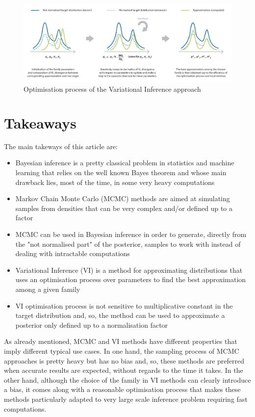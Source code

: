 \begin{figure}[h]
    \centering
\includegraphics[width=\textwidth]{pic/p05c07-snip08.png}
    \caption{Optimisation process of the Variational Inference approach}
    \label{fig:p05c07-snip08}
\end{figure}


\section{Takeaways}

The main takeways of this article are:
\begin{itemize}
    \item Bayesian inference is a pretty classical problem in statistics and machine learning that relies on the well known Bayes theorem and whose main drawback lies, most of the time, in some very heavy computations
    \item Markov Chain Monte Carlo (MCMC) methods are aimed at simulating samples from densities that can be very complex and/or defined up to a factor
    \item MCMC can be used in Bayesian inference in order to generate, directly from the "not normalised part" of the posterior, samples to work with instead of dealing with intractable computations
    \item Variational Inference (VI) is a method for approximating distributions that uses an optimisation process over parameters to find the best approximation among a given family
    \item VI optimisation process is not sensitive to multiplicative constant in the target distribution and, so, the method can be used to approximate a posterior only defined up to a normalisation factor
\end{itemize}
    

As already mentioned, MCMC and VI methods have different properties that imply different typical use cases. In one hand, the sampling process of MCMC approaches is pretty heavy but has no bias and, so, these methods are preferred when accurate results are expected, without regards to the time it takes. In the other hand, although the choice of the family in VI methods can clearly introduce a bias, it comes along with a reasonable optimisation process that makes these methods particularly adapted to very large scale inference problem requiring fast computations.

